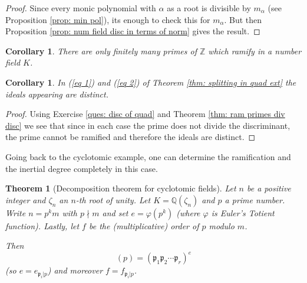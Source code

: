 \documentclass[11pt,a4paper]{report}
\theoremstyle{plain}
\newtheorem{thm}[subsection]{Theorem}
\newtheorem{cor}[subsection]{Corollary}
\theoremstyle{definition}
\theoremstyle{definition}
\newcommand{\ZZ}{\mathbb{Z}}
\def\QQ{\mathbb{Q}}
\def\gothp{\mathfrak{p}}
\def \a{\alpha}
\begin{document}
	\begin{proof}
		Since every monic polynomial with $\a$ as a root is divisible by $m_\a$ (see Proposition \ref{prop: min pol}), its enough to check this for $m_\a$. But then Proposition \ref{prop: num field disc in terms of norm} gives the result.
	\end{proof}
	
	\begin{cor}
		There are only finitely many primes of\/ $\ZZ$ which ramify in  a number field $K$.
	\end{cor}
	
	\begin{cor}\label{cor: ids are disc}
		In (\ref{eq 1}) and (\ref{eq 2}) of Theorem \ref{thm: splitting in quad ext}   the ideals appearing are distinct.
	\end{cor}
	
	\begin{proof}
		Using Exercise \ref{ques: disc of quad} and Theorem \ref{thm: ram primes div disc} we see that since in each case the prime does not divide the discriminant, the prime cannot be ramified and therefore the ideals are distinct.
	\end{proof}
	
	
	
	Going back to the cyclotomic example, one can determine the ramification and the inertial degree completely in this case.
	
	\begin{thm}[Decomposition theorem for cyclotomic fields]
		Let $n$ be a positive integer and $\zeta_n$ an $n$-th root of unity. Let $K=\QQ(\zeta_n)$ and $p$ a prime number. Write $n=p^km$ with $p \nmid m$ and set $e=\varphi(p^k)$ (where $\varphi$ is Euler's Totient function). Lastly, let $f$ be the (multiplicative) order of $p$ modulo $m$. 
		
		Then \[(p)=(\gothp_1 \gothp_2\cdots \gothp_r)^e\] (so $e=e_{\gothp_i|p}$) and moreover $f=f_{\gothp_i|p}$.
	\end{thm}
	
\end{document}
